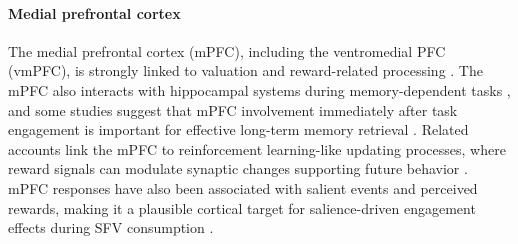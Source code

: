 \documentclass[10pt, twocolumn]{article}
\begin{document}
\paragraph{Medial prefrontal cortex}
The medial prefrontal cortex (mPFC), including the ventromedial PFC (vmPFC), is strongly linked to valuation and reward-related processing \cite{Bartra2013TheVS}. The mPFC also interacts with hippocampal systems during memory-dependent tasks \cite{Euston2012TheRO, Hyman2005MedialPC, Siapas2005PrefrontalPL}, and some studies suggest that mPFC involvement immediately after task engagement is important for effective long-term memory retrieval \cite{Euston2012TheRO}. Related accounts link the mPFC to reinforcement learning-like updating processes, where reward signals can modulate synaptic changes supporting future behavior \cite{Euston2012TheRO, Holroyd2002TheNB}. mPFC responses have also been associated with salient events and perceived rewards, making it a plausible cortical target for salience-driven engagement effects during SFV consumption \cite{Euston2012TheRO, Rushworth2011FrontalCA}.


\end{document}
